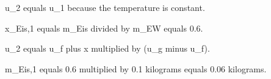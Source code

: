 u_2 equals u_1 because the temperature is constant.  

x_Eis,1 equals m_Eis divided by m_EW equals 0.6.  

u_2 equals u_f plus x multiplied by (u_g minus u_f).  

m_Eis,1 equals 0.6 multiplied by 0.1 kilograms equals 0.06 kilograms.